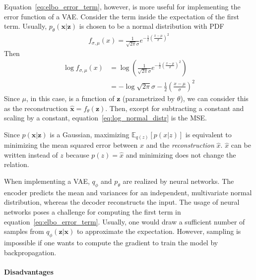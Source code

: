 Equation~\ref{eq:elbo_error_term}, however, is more useful for implementing the error function of a \ac{VAE}.
Consider the term inside the expectation of the first term.
Usually, $p_\theta(\bm{x}|\bm{z})$ is chosen to be a normal distribution with \ac{PDF}
\begin{align}
    f_{\sigma,\mu}(x) = \frac{1}{\sqrt{2\pi}\sigma}e^{-\frac{1}{2}\left( \frac{x-\mu}{\sigma} \right)^2}
\end{align}
Then
\begin{align}
    \log f_{\sigma,\mu}(x) &= \log \left( \frac{1}{\sqrt{2\pi}\sigma}e^{-\frac{1}{2}\left( \frac{x-\mu}{\sigma} \right)^2} \right)\\
    &= - \log \sqrt{2\pi}\sigma -\frac{1}{2}\left( \frac{x-\mu}{\sigma} \right)^2 \label{eq:log_normal_distr}
\end{align}
Since $\mu$, in this case, is a function of $\bm{z}$ (parametrized by $\theta$), we can consider this as the reconstruction $\hat{\bm{x}} = f_\theta(\bm{z})$.
Then, except for subtracting a constant and scaling by a constant, equation~\ref{eq:log_normal_distr} is the \ac{MSE}.

Since $p(\bm{x}|\bm{z})$ is a Gaussian, maximizing $\mathbb{E}_{q(z)} \left[ p(x|z) \right]$ is equivalent to minimizing the mean squared error between $x$ and the \textit{reconstruction} $\hat{x}$.
$\hat{x}$ can be written instead of $z$ because $p(z) = \hat{x}$ and minimizing does not change the relation.

When implementing a \ac{VAE}, $q_\phi$ and $p_\theta$ are realized by neural networks.
The encoder predicts the mean and variances for an independent, multivariate normal distribution, whereas the decoder reconstructs the input.
The usage of neural networks poses a challenge for computing the first term in equation~\ref{eq:elbo_error_term}.
Usually, one would draw a sufficient number of samples from $q_\phi(\bm{z}|\bm{x})$ to approximate the expectation.
However, sampling is impossible if one wants to compute the gradient to train the model by backpropagation.

\paragraph{Disadvantages}

